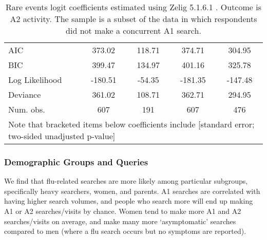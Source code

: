 \documentclass[12pt]{article}
\begin{document}
\begin{table}
\begin{center}
\begin{tabular}{l c c c c }
\hline
AIC            & 373.02          & 118.71          & 374.71          & 304.95          \\
BIC            & 399.47          & 134.97          & 401.16          & 325.78          \\
Log Likelihood & -180.51         & -54.35          & -181.35         & -147.48         \\
Deviance       & 361.02          & 108.71          & 362.71          & 294.95          \\
Num. obs.      & 607             & 191             & 607             & 476             \\
\hline
\multicolumn{5}{l}{\scriptsize{Note that bracketed items below coefficients include [standard error; two-sided unadjusted p-value]}}
\end{tabular}
\caption{Rare events logit coefficients estimated using Zelig 5.1.6.1 \citep{choirat_etal_2020}. Outcome is A2 activity. The sample is a subset of the data in which respondents did not make a concurrent A1 search.}
\label{table:coefficients_a2}
\end{center}
\end{table}

\subsubsection{Demographic Groups and Queries}

We find that flu-related searches are more likely among particular subgroups, specifically heavy searchers, women, and parents. A1 searches are correlated with having higher search volumes, and people who search more will end up making A1 or A2 searches/visits by chance. Women tend to make more A1 and A2 searches/visits on average, and make many more `asymptomatic' searches compared to men (where a flu search occurs but no symptoms are reported). 
\end{document}

